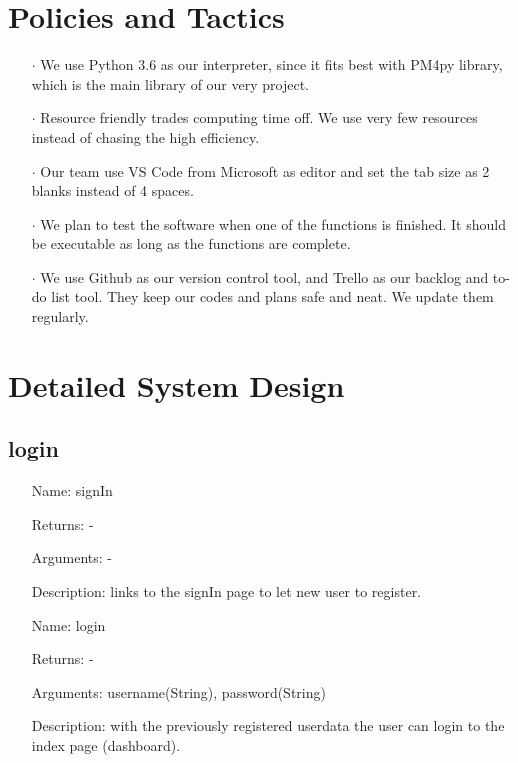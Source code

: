 \documentclass[runningheads]{llncs}
\begin{document}
\section{Policies and Tactics}

\begin{itemize}
	\item[\Large $\cdot$] We use Python 3.6 as our interpreter, since it fits best with PM4py library, which is the main library of our very project.\\
	\item[\Large $\cdot$] Resource friendly trades computing time off. We use very few resources instead of chasing the high efficiency.\\
	\item[\Large $\cdot$] Our team use VS Code from Microsoft as editor and set the tab size as 2 blanks instead of 4 spaces.\\
	\item[\Large $\cdot$] We plan to test the software when one of the functions is finished. It should be executable as long as the functions are complete.\\
	\item[\Large $\cdot$] We use Github as our version control tool, and Trello as our backlog and to-do list tool. They keep our codes and plans safe and neat. We update them regularly.
\end{itemize}

\section{Detailed System Design}
\subsection{login}
\begin{itemize}
	\item[Name:] signIn
	\item[Returns:] -
	\item[Arguments:] -
	\item[Description:] links to the signIn page to let new user to register.
\end{itemize}

\begin{itemize}
	\item[Name:] login
	\item[Returns:] -
	\item[Arguments:] username(String), password(String)
	\item[Description:] with the previously registered userdata the user can login to the index page (dashboard).
\end{itemize}
\end{document}
